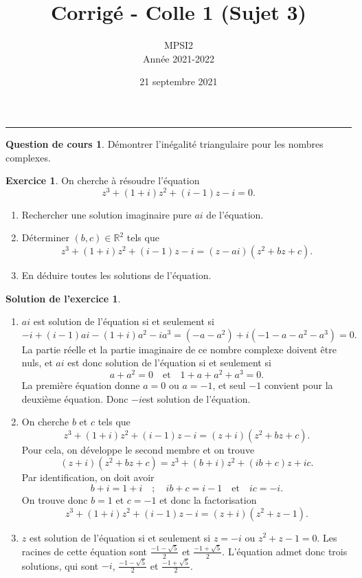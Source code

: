 \documentclass[a4paper, 11pt,openany]{article}%
\title{Corrigé - Colle 1 (Sujet 3)}
\author{MPSI2\\
Année 2021-2022}
\date{21 septembre 2021}
\theoremstyle{plain}
\theoremstyle{definition}
\newtheorem{cours}{Question de cours}
\newtheorem{exo}{Exercice}
\newtheorem{sol}{Solution de l'exercice}
\theoremstyle{remark}
\newcommand{\R}{\mathbb{R}}
\begin{document}
   \maketitle
      \rule{\linewidth}{0.5mm}

\begin{cours}
Démontrer l'inégalité triangulaire pour les nombres complexes.
\end{cours}

\begin{exo}
On cherche à résoudre l'équation 
\[ z^3+ (1+i)z^2+(i-1)z-i=0.\]
\begin{enumerate}
\item Rechercher une solution imaginaire pure $ai$ de l'équation.
\item Déterminer $(b,c) \in \R^2$ tels que
\[ z^3 + (1+i)z^2+(i-1)z-i= (z-ai)(z^2 + bz +c).\]
\item En déduire toutes les solutions de l'équation.
\end{enumerate}
\end{exo}


\begin{sol}
\begin{enumerate}
\item $ai$ est solution de l'équation si et seulement si 
\[ -i+(i-1)ai-(1+i)a^2-ia^3=(-a-a^2)+i(-1-a-a^2-a^3)=0.\]
 La partie réelle et la partie imaginaire de ce nombre complexe doivent être nuls, et $ai$ est donc solution de l'équation si et seulement si \[ a + a^2 = 0 \quad \text{et} \quad 1+a+a^2+a^3=0.\] La première équation donne $a=0$ ou $a=-1$, et seul $-1$ convient pour la deuxième équation. Donc $-i$est solution de l'équation.
 \item On cherche $b$ et $c$ tels que
\[ z^3+(1+i)z^2+(i-1)z-i=(z+i)(z^2+bz+c).\]
 Pour cela, on développe le second membre et on trouve 
 \[ (z+i)(z^2+bz+c)=z^3+(b+i)z^2+(ib+c)z+ic.\]
  Par identification, on doit avoir
  \[ b+i = 1+i \quad ; \quad ib +c = i-1 \quad \text{et} \quad ic = -i.\]
 On trouve donc $b=1$ et $c=-1$ et donc la factorisation 
 \[ z^3+(1+i)z^2+(i-1)z-i=(z+i)(z^2+z-1).\]
 \item $z$ est solution de l'équation si et seulement si $z=-i$ ou $z^2+z-1=0$. Les racines de cette équation sont $\frac{-1-\sqrt{5}}{2}$ et $\frac{-1+\sqrt{5}}{2}$. L'équation admet donc trois solutions, qui sont $-i$, $\frac{-1-\sqrt{5}}{2}$ et $\frac{-1+\sqrt{5}}{2}$. 
\end{enumerate}
\end{sol}
\end{document}
